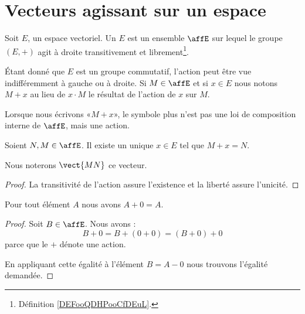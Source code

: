 
\section{Vecteurs agissant sur un espace}

\begin{definition}
	Soit \( E\), un espace vectoriel. Un  \( E\) est un ensemble \( \affE\) sur lequel le groupe \( (E,+)\) agit à droite transitivement et librement\footnote{Définition \ref{DEFooQDHPooCfDEuL}.}.
\end{definition}

Étant donné que \( E\) est un groupe commutatif, l'action peut être vue indifféremment à gauche ou à droite. Si \( M\in\affE\) et si \( x\in E\) nous notons \( M+x\) au lieu de \( x\cdot M\) le résultat de l'action de \( x\) sur \( M\).

\begin{normaltext}      \label{NORMooZANAooQdXqlh}
	Lorsque nous écrivons «\( M+x\)», le symbole plus n'est pas une loi de composition interne de \( \affE\), mais une action.
\end{normaltext}

\begin{propositionDef}      \label{DEFooWAYTooMLbqEE}
	Soient \( N,M\in\affE\). Il existe un unique \( x\in E\) tel que \( M+x=N\).

	Nous noterons \( \vect{ MN }\) ce vecteur.
\end{propositionDef}

\begin{proof}
	La transitivité de l'action assure l'existence et la liberté assure l'unicité.
\end{proof}

\begin{lemma}       \label{LEMooFZCRooQxzObv}
	Pour tout élément \( A\) nous avons \( A+0=A\).
\end{lemma}

\begin{proof}
	Soit \( B\in \affE\). Nous avons :
	\begin{equation}
		B+0=B+(0+0)=(B+0)+0
	\end{equation}
	parce que le \( +\) dénote une action.

	En appliquant cette égalité à l'élément \( B=A-0\) nous trouvons l'égalité demandée.
\end{proof}

